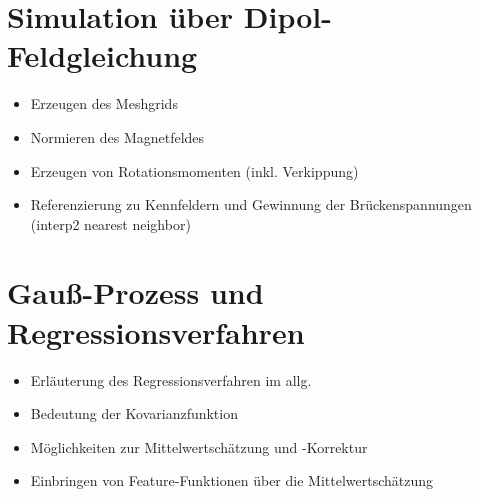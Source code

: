 \section{Simulation über Dipol-Feldgleichung}
	\begin{itemize}
		\item Erzeugen des Meshgrids
		\item Normieren des Magnetfeldes
		\item Erzeugen von Rotationsmomenten (inkl. Verkippung)
		\item Referenzierung zu Kennfeldern und Gewinnung der Brückenspannungen (interp2 nearest neighbor)
	\end{itemize}

\section{Gauß-Prozess und Regressionsverfahren}
	\begin{itemize}
		\item Erläuterung des Regressionsverfahren im allg.
		\item Bedeutung der Kovarianzfunktion
		\item Möglichkeiten zur Mittelwertschätzung und -Korrektur
		\item Einbringen von Feature-Funktionen über die Mittelwertschätzung
	\end{itemize}